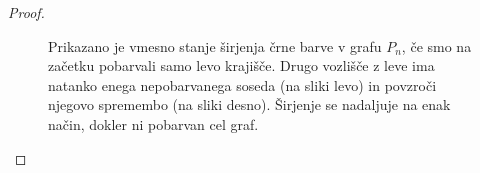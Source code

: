 \documentclass[12pt,a4paper,twoside]{article}
\theoremstyle{definition} %
\theoremstyle{plain} %
\numberwithin{equation}{section}  %
\begin{document}
\begin{proof}
\begin{figure}[h]
\begin{subfigure}{0.49\textwidth}
        \end{subfigure}
        \caption{Prikazano je vmesno stanje širjenja črne barve v grafu $P_n$, če smo na začetku pobarvali samo levo krajišče. Drugo vozlišče z leve ima natanko enega nepobarvanega soseda (na sliki levo) in povzroči njegovo spremembo (na sliki desno). Širjenje se nadaljuje na enak način, dokler ni pobarvan cel graf.}
        \label{fig:pot}
    \end{figure}
\end{proof}
\end{document}
